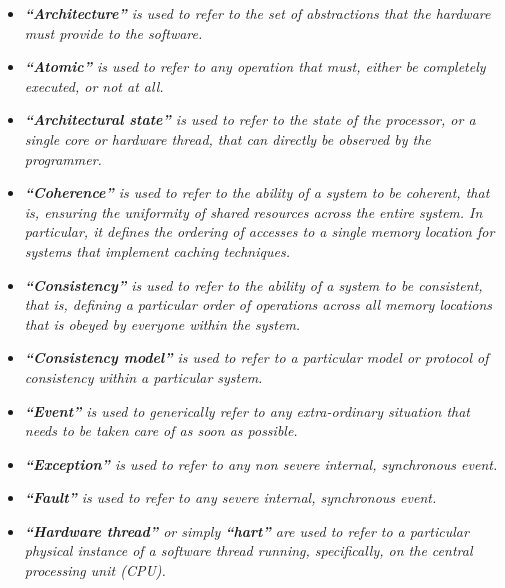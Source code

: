 \documentclass{article}
\begin{document}
            \begin{itemize}

                \item \textit{\textbf{``Architecture''} is used to refer to the set of abstractions that the hardware must provide to the software.}

                \item \textit{\textbf{``Atomic''} is used to refer to any operation that must, either be completely executed, or not at all.}

                \item \textit{\textbf{``Architectural state''} is used to refer to the state of the processor, or a single core or hardware thread, that can directly be observed by the programmer.}

                \item \textit{\textbf{``Coherence''} is used to refer to the ability of a system to be coherent, that is, ensuring the uniformity of shared resources across the entire system. In particular, it defines the ordering of accesses to a single memory location for systems that implement caching techniques.}

                \item \textit{\textbf{``Consistency''} is used to refer to the ability of a system to be consistent, that is, defining a particular order of operations across all memory locations that is obeyed by everyone within the system.}

                \item \textit{\textbf{``Consistency model''} is used to refer to a particular model or protocol of consistency within a particular system.}

                \item \textit{\textbf{``Event''} is used to generically refer to any extra-ordinary situation that needs to be taken care of as soon as possible.}

                \item \textit{\textbf{``Exception''} is used to refer to any non severe internal, synchronous event.}

                \item \textit{\textbf{``Fault''} is used to refer to any severe internal, synchronous event.}

                \item \textit{\textbf{``Hardware thread''} or simply \textbf{``hart''} are used to refer to a particular physical instance of a software thread running, specifically, on the central processing unit (CPU).}


\end{itemize}
\end{document}
